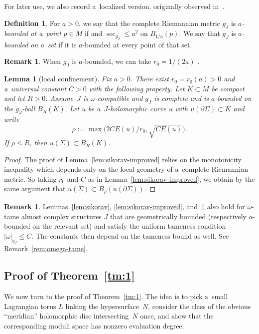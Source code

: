 \documentclass[10pt,a4paper]{amsart}
\numberwithin{equation}{section}
\DeclareMathOperator{\inj}{inj}
\DeclareMathOperator{\Sec}{sec}
\newtheorem{lm}[Theorem]{Lemma}
\theoremstyle{definition}
\newtheorem{df}[Theorem]{Definition}
\newtheorem{rem}[Theorem]{Remark}
\begin{document}
For later use, we also record a~localized version, originally observed in~\cite{GromanFloerOpen}.
\begin{df}\label{df:a-bounded}
 For $a>0$, we say that the complete Riemannian metric $g_J$ is \emph{$a$-bounded at a~point} $p\in M$ if \smash{$\inj_{g_J}(p)\ge \frac{1}{a}$} and $\Sec_{g_J}\le a^{2}$ on $B_{1/a}(p)$. We say that $g_J$ is \emph{$a$-bounded on a~set} if it is $a$-bounded at every point of that set.
\end{df}
\begin{rem}
 When $g_J$ is $a$-bounded, we can take $r_0=1/(2a)$ \cite[Theorem 4.4.1 and Remark~4.4.3]{McDuffSalamonJHol}.
\end{rem}

\begin{lm}[local confinement]\label{lem:local-confinement}
Fix $a>0$. There exist $r_0=r_0(a)>0$ and a~universal constant $C>0$ with the following property. Let $K\subset M$ be compact and let $R>0$.
Assume~$J$ is $\omega$-compatible and $g_J$ is complete and is $a$-bounded on the $g_J$-ball $B_{R}(K)$.
Let $u$ be a~$J$-holomorphic curve $u$ with $u(\partial\Sigma)\subset K$ and write
\[
\rho:=\max\bigl(2CE(u)/r_0,\sqrt{CE(u)}\bigr).
\]
If $\rho\le R$, then $u(\Sigma)\subset B_R(K)$.
\end{lm}
\begin{proof}
The proof of Lemma~\ref{lem:sikorav-improved} relies on the monotonicity inequality which depends only on the local geometry of a~complete Riemannian metric. So taking $r_0$ and $C$ as in Lemma~\ref{lem:sikorav-improved}, we obtain by the same argument that
$
u(\Sigma)\subset B_{\rho}(u(\partial\Sigma))
$.
\end{proof}

\begin{rem}
Lemmas~\ref{lem:sikorav}, \ref{lem:sikorav-improved}, and~\ref{lem:local-confinement} also hold for $\omega$-tame almost complex structures $J$ that are geometrically bounded (respectively $a$-bounded on the relevant set) and satisfy the uniform tameness condition $|\omega|_{g_J}\le C$. The constants then depend on the tameness bound as well. See Remark~\ref{rem:omega-tame}.
\end{rem}

\subsection{Proof of Theorem~\ref{tm:1}}\label{subsec:Proof:tm:1}
We now turn to the proof of Theorem~\ref{tm:1}.
The idea is to pick a~small Lagrangian torus $L$ linking the hypersurface~$N$, consider the class of the obvious ``meridian'' holomorphic disc intersecting~$N$ once, and show that the corresponding moduli space has nonzero evaluation degree.
\end{document}
